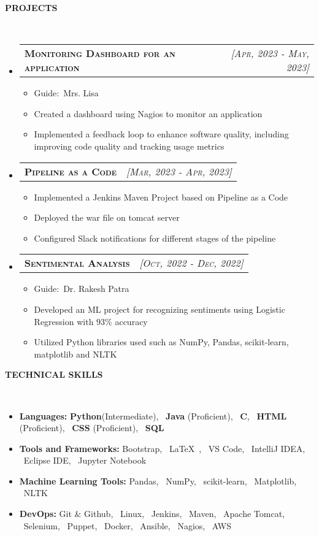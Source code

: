 \documentclass[a4paper,10pt]{article}
\makeatletter
\newcommand{\lsep}{-0.5cm}
\newcommand{\resitem}[1]{\item #1 \vspace{-2pt}}
\newcommand{\resheading}[1]{{\small \colorbox{mygrey}{\begin{minipage}{0.975\textwidth}{\textbf{#1 \vphantom{p\^{E}}}}\end{minipage}}}}
\newcommand{\ressubheading}[3]{
\begin{tabular*}{6.62in}{l @{\extracolsep{\fill}} r}
	\textsc{{\textbf{#1}}} & \textsc{\textit{[#2]}} \\
\end{tabular*}\vspace{-8pt}}
\makeatother
\begin{document}
\resheading{\textbf{PROJECTS} }\\[\lsep]
\begin{itemize}
\setlength\itemsep{0.5em}
\item \ressubheading{Monitoring Dashboard for an application} {Apr, 2023 - May, 2023}{}
\begin{itemize}
    \resitem{Guide:\ Mrs. Lisa}
    \resitem{Created a dashboard using Nagios to monitor an application}
    \resitem{Implemented a feedback loop to enhance software quality, including improving code quality and tracking usage metrics}
\end{itemize}

\item \ressubheading{Pipeline as a Code}{Mar, 2023 - Apr, 2023}{}
\begin{itemize}
    \resitem{Implemented a Jenkins Maven Project based on Pipeline as a Code}
    \resitem{Deployed the war file on tomcat server}
    \resitem{Configured Slack notifications for different stages of the pipeline}
\end{itemize}

\item \ressubheading{Sentimental Analysis}{Oct, 2022 - Dec, 2022}{}
\begin{itemize}
    \resitem{Guide:\ Dr. Rakesh Patra}
    \resitem{Developed an ML project for recognizing sentiments using Logistic Regression with $93\%$ accuracy}
    \resitem{Utilized Python libraries used such as NumPy, Pandas, scikit-learn, matplotlib and NLTK}
\end{itemize} 
\end{itemize}

\resheading{\textbf{TECHNICAL SKILLS} }\\[\lsep]
\begin{itemize}
\setlength\itemsep{0em}
\item \noindent \textbf{Languages:} \textbf{Python}(Intermediate), \ \textbf{Java} (Proficient), \ \textbf{C}, \ \textbf{HTML} (Proficient), \ \textbf{CSS} (Proficient), \ \textbf{SQL}
\item \noindent\textbf{Tools and Frameworks:} Bootstrap, \  \LaTeX\ , \ VS Code, \ IntelliJ IDEA, \ Eclipse IDE, \ Jupyter Notebook
\item \noindent \textbf{Machine Learning Tools:} Pandas, \ NumPy, \ scikit-learn, \ Matplotlib, \ NLTK
\item \noindent \textbf{DevOps:} Git \& Github, \ Linux, \ Jenkins, \ Maven, \ Apache Tomcat, \ Selenium, \ Puppet, \ Docker, \ Ansible, \ Nagios, \ AWS
\end{itemize}
\end{document}
